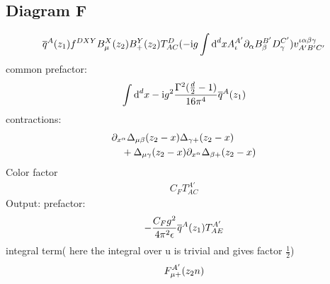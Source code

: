 \subsection{Diagram F}
\begin{align}
\overline q^A(z_1) f^{DXY} B_\mu^X(z_2)B_+^Y(z_2) T^D_{AC}  (-\text{i} g \int \text{d} ^d x A^{A'}_\iota \partial_\alpha B_\beta^{B'}D_\gamma^{C'})v^{\iota\alpha\beta\gamma}_{A'B'C'}
\end{align}
common prefactor:
\begin{align}
\int \text{d} ^d x -\text{i} g^2  \frac{\Gamma^2(\frac{d}{2}-1)}{16\pi^4}\overline q^A(z_1)
\end{align}
contractions:
\begin{align}
&\partial_{x^\alpha}\Delta_{\mu \beta}(z_2-x)\Delta_{\gamma +}(z_2-x)
\\&~~~ 
+\Delta_{\mu \gamma}(z_2-x)\partial_{x^\alpha}\Delta_{\beta +}(z_2-x)
\end{align}
Color factor
\begin{align}
{C_F} T^{A'}_{AC}
\end{align}
Output:
prefactor:
\begin{align}
-\frac{ C_F g^2}{4 \pi^2 \epsilon}\overline q^A(z_1) T^{A'}_{AE}
\end{align}
integral term( here the integral over u is trivial and gives factor $\frac12$)
\begin{align}
F_{\mu +}^{A'}(z_2n)
\end{align}

